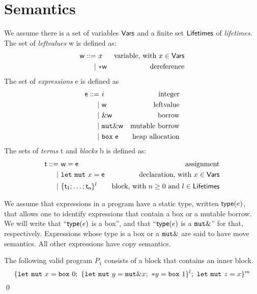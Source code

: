 \section{Semantics}\label{sec:semantics}

\begin{definition}
  We assume there is a set of variables $\mathsf{Vars}$
  and a finite set $\mathsf{Lifetimes}$ of \emph{lifetimes}.
  The set of \emph{leftvalues} \textsf{w} is defined as:
  \begin{align*}
    \mathsf{w} ::= &\ x & \text{variable, with $x\in\mathsf{Vars}$}\\
    | &\ \mathtt{*}\mathsf{w} & \text{dereference}
  \end{align*}
  The set of \emph{expressions} \textsf{e} is defined as
  \begin{align*}
    \mathsf{e} ::= &\ i & \text{integer}\\
    | &\ \mathsf{w} & \text{leftvalue}\\
    | &\ \&\mathsf{w} & \text{borrow}\\
    | &\ \mathtt{mut}\&\mathsf{w} & \text{mutable borrow}\\
    | &\ \mathtt{box}\ \mathsf{e} & \text{heap allocation}
  \end{align*}
  The sets of \emph{terms} \textsf{t} and \emph{blocks} \textsf{b}
  is defined as:
  \begin{align*}
    \mathsf{t} ::= &\ \mathsf{w}=\mathsf{e} & \text{assignment}\\
    | &\ \mathtt{let\ mut}\ x=\mathsf{e} & \text{declaration, with $x\in\mathsf{Vars}$}\\
    | &\ \{\mathsf{t_1};\ldots;\mathsf{t_n}\}^l & \text{block, with $n\ge 0$ and $l\in\mathsf{Lifetimes}$}
  \end{align*}
\end{definition}

\begin{definition}
  We assume that expressions in a program have a static type, written $\mathsf{type}(e)$, that allows one
  to identify expressions that contain a box or a mutable borrow. We will write that
  ``$\mathsf{type}(e)$ is a box'', and that ``$\mathsf{type}(e)$ is a $\texttt{mut}\&$'' for that, respectively.
  Expressions whose type is a box or a $\texttt{mut}\&$ are said to have move semantics.
  All other expressions have copy semantics.
\end{definition}

\begin{example}\label{ex:program}
  The following valid program $P_1$ consists of a block that contains
  an inner block.
  \[
    \{
      \mathtt{let\ mut}\ x = \mathtt{box}\ 0;\
      \{\mathtt{let\ mut}\ y = \mathtt{mut}\& x;\
      \mathtt{*}y = \mathtt{box}\ 1\}^l;\
      \mathtt{let\ mut}\ z = x
    \}^m
  \]
  \qed
\end{example}

